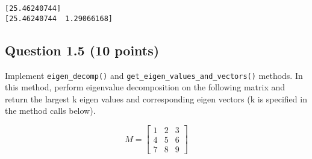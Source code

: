 \documentclass[11pt]{article}
\begin{document}
    \begin{Verbatim}[commandchars=\\\{\}]
[25.46240744]
[25.46240744  1.29066168]

    \end{Verbatim}

    \subsection{Question 1.5 (10 points)}\label{question-1.5-10-points}

Implement \texttt{eigen\_decomp()} and
\texttt{get\_eigen\_values\_and\_vectors()} methods. In this method,
perform eigenvalue decomposition on the following matrix and return the
largest k eigen values and corresponding eigen vectors (k is specified
in the method calls below).

\[M = \begin{bmatrix}
1 & 2 & 3 \\
4 & 5 & 6 \\
7 & 8 & 9 \end{bmatrix}
\]
\end{document}
